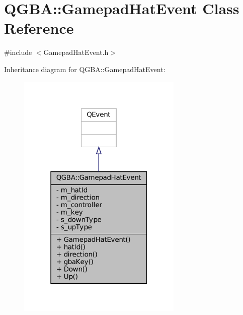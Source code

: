 \hypertarget{class_q_g_b_a_1_1_gamepad_hat_event}{}\section{Q\+G\+BA\+:\+:Gamepad\+Hat\+Event Class Reference}
\label{class_q_g_b_a_1_1_gamepad_hat_event}


{\ttfamily \#include $<$Gamepad\+Hat\+Event.\+h$>$}



Inheritance diagram for Q\+G\+BA\+:\+:Gamepad\+Hat\+Event\+:
\nopagebreak
\begin{figure}[H]
\begin{center}
\leavevmode
\includegraphics[width=223pt]{class_q_g_b_a_1_1_gamepad_hat_event__inherit__graph}
\end{center}
\end{figure}


